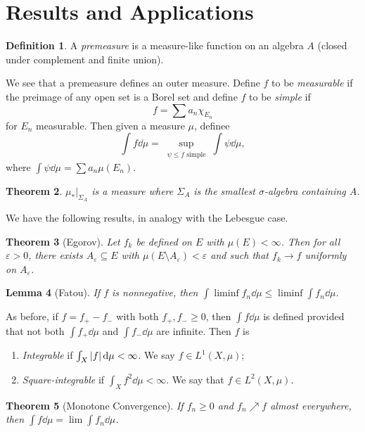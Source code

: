 \documentclass[leqno, openany]{memoir}
\newtheorem{thm}{Theorem}[chapter]
\newtheorem{lem}[thm]{Lemma}
\theoremstyle{definition}
\newtheorem{defn}[thm]{Definition}
\theoremstyle{remark}
\theoremstyle{plain}
\theoremstyle{definition}
\theoremstyle{remark}
\newcommand{\ep}{\varepsilon}
\begin{document}
\section{Results and Applications}%

\begin{defn} A \textit{premeasure} is a measure-like function on an algebra $A$
(closed under complement and finite union).  \end{defn}

We see that a premeasure defines an outer measure. Define $f$ to be
\textit{measurable} if the preimage of any open set is a Borel set and define
$f$ to be \textit{simple} if \[ f = \sum a_n \chi_{E_n} \] for $E_n$
measurable. Then given a measure $\mu$, definee \[ \int f \dd{\mu} =
\sup_{\substack{\psi \leq f \text{ simple}}} \int \psi \dd{\mu}, \] where $\int
\psi \dd{\mu} = \sum a_n \mu(E_n)$.

\begin{thm} $\mu_* |_{\Sigma_A}$ is a measure where $\Sigma_A$ is the smallest
$\sigma$-algebra containing $A$.  \end{thm}

We have the following results, in analogy with the Lebesgue case.

\begin{thm}[Egorov] Let $f_k$ be defined on $E$ with $\mu(E) < \infty$. Then
for all $\ep > 0$, there exists $A_{\ep} \subseteq E$ with $\mu(E \setminus
A_{\ep}) < \ep$ and such that $f_k \to f$ uniformly on $A_{\ep}$.  \end{thm}

\begin{lem}[Fatou] If $f$ is nonnegative, then $\int \liminf f_n \dd{\mu} \leq
\liminf \int f_n \dd{\mu}$.  \end{lem}

As before, if $f = f_+ - f_-$ with both $f_+, f_- \geq 0$, then $\int f
\dd{\mu}$ is defined provided that not both $\int f_+ \dd{\mu}$ and $\int f_-
\dd{\mu}$ are infinite. Then $f$ is \begin{enumerate} \item \textit{Integrable}
    if $\int_X \abs{f} \dd{\mu} < \infty$. We say $f \in L^1(X, \mu)$; \item
    \textit{Square-integrable} if $\int_X f^2 \dd{\mu} < \infty$. We say that
    $f \in L^2(X, \mu)$.  \end{enumerate}

\begin{thm}[Monotone Convergence] If $f_n \geq 0$ and $f_n \nearrow f$ almost
everywhere, then $\int f \dd{\mu} = \lim \int f_n \dd{\mu}$.  \end{thm}
\end{document}
